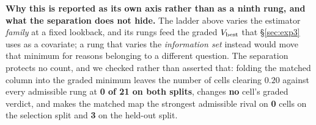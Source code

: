 \textbf{Why this is reported as its own axis rather than as a ninth rung, and what
the separation does not hide.}  The ladder above varies the estimator
\emph{family} at a fixed lookback, and its rungs feed the graded
$V_{\text{best}}$ that \S\ref{sec:exp3} uses as a covariate; a rung that
varies the \emph{information set} instead would move that minimum for reasons
belonging to a different question.  The separation protects no count, and we
checked rather than asserted that: folding the matched column into the graded
minimum leaves the number of cells clearing $0.20$ against every admissible rung
at \textbf{0 of 21 on both splits}, changes \textbf{no} cell's graded verdict, and
makes the matched map the strongest admissible rival on \textbf{0} cells on the
selection split and \textbf{3} on the held-out split.

\begin{table}[ht]
\centering
\caption{\textbf{The gate with the baseline given Moirai's full $96{+}h$ history,
on the \emph{selection} windows.}  The same fitted ridge in both columns; only how
many of the available past steps it may use differs.  MSE ratio is
$\text{MSE}_{96+h}/\text{MSE}_{96}$, so below $1$ means the extra history made the
baseline stronger.  Bold clears $0.20$.  Generated by
\texttt{scripts/matched\_lookback\_gate.py --split val}.}
\label{tab:matchedlbval}

\end{table}

\begin{table}[ht]
\centering
\caption{\textbf{The same comparison on the \emph{held-out} windows.}  The
direction reverses: the matched map is stronger on 7 of 21 cells here against 12
of 21 on the selection windows, because the larger design matrix generalises away
from its fit region worse.  Generated by
\texttt{scripts/matched\_lookback\_gate.py --split test}.}
\label{tab:matchedlb}

\end{table}

